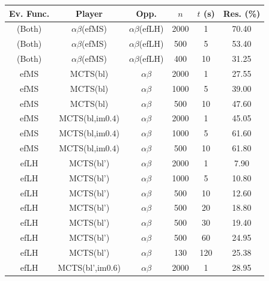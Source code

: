 \documentclass[conference]{IEEEtran}
\begin{document}
\begin{table}[t]
\begin{center}
\begin{tabular}{ccccc|c}
Ev. Func.  & Player              & Opp.                 & $n$    & $t$ (s) & Res. (\%) \\
\hline
(Both)     & $\alpha\beta$(efMS) & $\alpha\beta$(efLH)  & 2000   & 1       & 70.40     \\
(Both)     & $\alpha\beta$(efMS) & $\alpha\beta$(efLH)  &  500   & 5       & 53.40     \\
(Both)     & $\alpha\beta$(efMS) & $\alpha\beta$(efLH)  &  400   & 10      & 31.25     \\
\hline
\hline
efMS       & MCTS(bl)              & $\alpha\beta$    & 2000   & 1       & 27.55     \\     
efMS       & MCTS(bl)              & $\alpha\beta$    & 1000   & 5       & 39.00     \\     
efMS       & MCTS(bl)              & $\alpha\beta$    &  500   & 10      & 47.60     \\     
\hline
efMS       & MCTS(bl,im$0.4$)     & $\alpha\beta$    & 2000   & 1       & 45.05     \\     
efMS       & MCTS(bl,im$0.4$)     & $\alpha\beta$    & 1000   & 5       & 61.60     \\     
efMS       & MCTS(bl,im$0.4$)     & $\alpha\beta$    &  500   & 10      & 61.80     \\     
\hline
\hline
efLH       & MCTS(bl')              & $\alpha\beta$    & 2000   & 1       &  7.90      \\     
efLH       & MCTS(bl')              & $\alpha\beta$    & 1000   & 5       & 10.80      \\     
efLH       & MCTS(bl')              & $\alpha\beta$    &  500   & 10      & 12.60      \\     
efLH       & MCTS(bl')              & $\alpha\beta$    &  500   & 20      & 18.80      \\     
efLH       & MCTS(bl')              & $\alpha\beta$    &  500   & 30      & 19.40      \\     
efLH       & MCTS(bl')              & $\alpha\beta$    &  500   & 60      & 24.95      \\     
efLH       & MCTS(bl')              & $\alpha\beta$    &  130   & 120     & 25.38      \\     
\hline
efLH       & MCTS(bl',im$0.6$)     & $\alpha\beta$    & 2000   & 1       & 28.95      \\     

\end{tabular}
\end{center}
\end{table}
\end{document}
